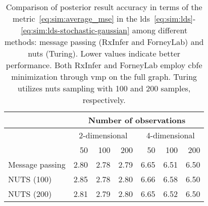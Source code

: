 \begin{table}
  \centering
  \begin{tabular}{ |l||r|r|r|r|r|r|  }
    \hline
                    & \multicolumn{6}{|c|}{Number of observations}                                                                   \\
    \hline
                    & \multicolumn{3}{|c|}{2-dimensional}          & \multicolumn{3}{|c|}{4-dimensional}                             \\
    \hline
                    & 50                                           & 100                                 & 200  & 50   & 100  & 200  \\
    \hline
    Message passing & 2.80                                         & 2.78                                & 2.79 & 6.65 & 6.51 & 6.50 \\
    \hline
    NUTS (100)      & 2.85                                         & 2.78                                & 2.80 & 6.66 & 6.58 & 6.50 \\
    NUTS (200)      & 2.81                                         & 2.79                                & 2.80 & 6.65 & 6.52 & 6.50 \\
    \hline
  \end{tabular}
  \caption{
    Comparison of posterior result accuracy in terms of the metric~\eqref{eq:sim:average_mse} in the \ac{lds}~\eqref{eq:sim:lds}-\eqref{eq:sim:lds-stochastic-gaussian} among different methods: message passing (RxInfer and ForneyLab) and \ac{nuts} (Turing).
    Lower values indicate better performance.
    Both RxInfer and ForneyLab employ \ac{cbfe} minimization through \ac{vmp} on the full graph.
    Turing utilizes \ac{nuts} sampling with 100 and 200 samples, respectively.
  }
  \label{table:sim:lds_accuracy_comparison_2_4}
\end{table}

